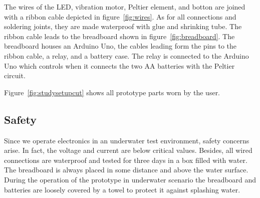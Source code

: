 
The wires of the LED, vibration motor, Peltier element, and botton are joined with a ribbon cable depicted in figure~\ref{fig:wires}.
As for all connections and soldering joints, they are made waterproof with glue and shrinking tube.
The ribbon cable leads to the breadboard shown in figure~\ref{fig:breadboard}.
The breadboard houses an Arduino Uno, the cables leading form the pins to the ribbon cable, a relay, and a battery case.
The relay is connected to the Arduino Uno  which controls when it connects the two AA batteries with the Peltier circuit.


%


Figure~\ref{fig:studysetupcut} shows all prototype parts worn by the user.
 


\subsection{Safety}

Since we operate electronics in an underwater test environment, safety concerns arise.
In fact, the voltage and current are below critical values.
Besides, all  wired connections are waterproof and tested for three days in a box filled with water.
The breadboard is always placed in some distance and above the water surface.
During the operation of the prototype in underwater scenario the breadboard and batteries are loosely covered by a towel to protect it against splashing water.

